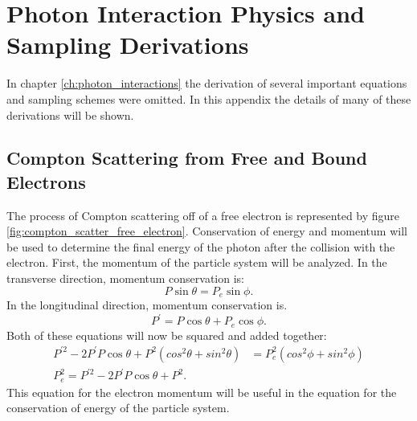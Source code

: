 \chapter{Photon Interaction Physics and Sampling Derivations}
\label{ch:appendix_B}
In chapter \ref{ch:photon_interactions} the derivation of several important
equations and sampling schemes were omitted. In this appendix the details of 
many of these derivations will be shown. 

\section{Compton Scattering from Free and Bound Electrons}
The process of Compton scattering off of a free electron is represented by 
figure \ref{fig:compton_scatter_free_electron}. Conservation of energy and 
momentum will be used to determine the final energy of the photon after the 
collision with the electron. First, the momentum of the particle system will be 
analyzed. In the transverse direction, momentum conservation is:
\begin{equation*}
  P\sin{\theta} = P_e\sin{\phi}.
\end{equation*}
In the longitudinal direction, momentum conservation is.
\begin{equation*}
  P^{'} = P\cos{\theta} + P_e\cos{\phi}.
\end{equation*}
Both of these equations will now be squared and added together:
\begin{align}
  P^{'2} - 2P^{'}P\cos{\theta} + P^2(cos^2\theta + sin^2\theta) & = 
  P_e^2(cos^2\phi + sin^2\phi) \nonumber \\
  P_e^2 = P^{'2} - 2P^{'}P\cos{\theta} + P^2.
\end{align}
This equation for the electron momentum will be useful in the equation for
the conservation of energy of the particle system.

